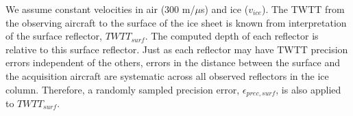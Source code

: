 
We assume constant velocities in air (300 m/${\mu}$s) and ice ($v_{ice}$). The TWTT from the observing aircraft to the surface of the ice sheet is known from interpretation of the surface reflector, $TWTT_{surf}$. The computed depth of each reflector is relative to this surface reflector. Just as each reflector may have TWTT precision errors independent of the others, errors in the distance between the surface and the acquisition aircraft are systematic across all observed reflectors in the ice column. Therefore, a randomly sampled precision error, $\epsilon_{prec,surf}$, is also applied to $TWTT_{surf}$. 







